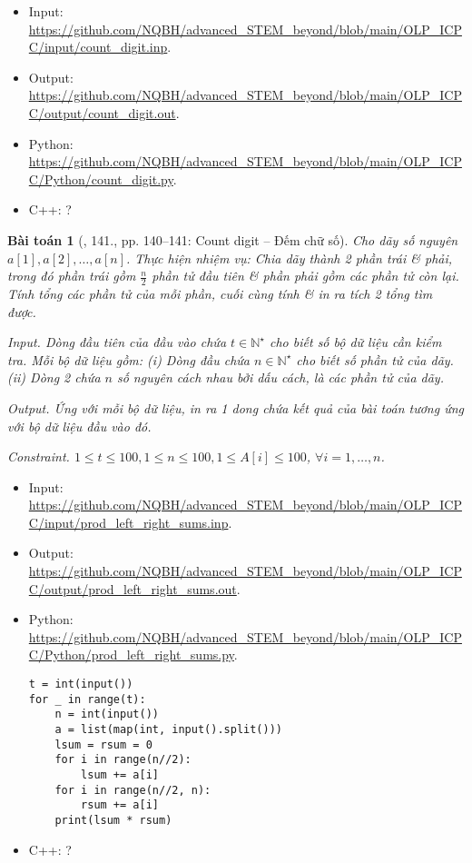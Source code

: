 \documentclass{article}
\newtheorem{baitoan}{Bài toán}
\begin{document}
\begin{itemize}
	\item Input: \url{https://github.com/NQBH/advanced_STEM_beyond/blob/main/OLP_ICPC/input/count_digit.inp}.
	\item Output: \url{https://github.com/NQBH/advanced_STEM_beyond/blob/main/OLP_ICPC/output/count_digit.out}.
	\item Python: \url{https://github.com/NQBH/advanced_STEM_beyond/blob/main/OLP_ICPC/Python/count_digit.py}.
	\item C++: ?
\end{itemize}

\begin{baitoan}[\cite{Duc_200_BT_Python}, 141., pp. 140--141: Count digit -- Đếm chữ số]
	Cho dãy số nguyên $a[1],a[2],\ldots,a[n]$. Thực hiện nhiệm vụ: Chia dãy thành 2 phần trái \& phải, trong đó phần trái gồm $\frac{n}{2}$ phần tử đầu tiên \& phần phải gồm các phần tử còn lại. Tính tổng các phần tử của mỗi phần, cuối cùng tính \& in ra tích 2 tổng tìm được.
	\item {\sf Input.} Dòng đầu tiên của đầu vào chứa $t\in\mathbb{N}^\star$ cho biết số bộ dữ liệu cần kiểm tra. Mỗi bộ dữ liệu gồm: (i) Dòng đầu chứa $n\in\mathbb{N}^\star$ cho biết số phần tử của dãy. (ii) Dòng 2 chứa $n$ số nguyên cách nhau bởi dấu cách, là các phần tử của dãy.
	\item {\sf Output.} Ứng với mỗi bộ dữ liệu, in ra 1 dong chứa kết quả của bài toán tương ứng với bộ dữ liệu đầu vào đó.
	\item {\sf Constraint.} $1\le t\le100,1\le n\le100,1\le A[i]\le100$, $\forall i = 1,\ldots,n$.
\end{baitoan}

\begin{itemize}
	\item Input: \url{https://github.com/NQBH/advanced_STEM_beyond/blob/main/OLP_ICPC/input/prod_left_right_sums.inp}.
	\item Output: \url{https://github.com/NQBH/advanced_STEM_beyond/blob/main/OLP_ICPC/output/prod_left_right_sums.out}.
	\item Python: \url{https://github.com/NQBH/advanced_STEM_beyond/blob/main/OLP_ICPC/Python/prod_left_right_sums.py}.
	\begin{verbatim}
t = int(input())
for _ in range(t):
    n = int(input())
    a = list(map(int, input().split()))
    lsum = rsum = 0
    for i in range(n//2):
        lsum += a[i]
    for i in range(n//2, n):
        rsum += a[i]
    print(lsum * rsum)
	\end{verbatim}
	\item C++: ?
\end{itemize}
\end{document}
